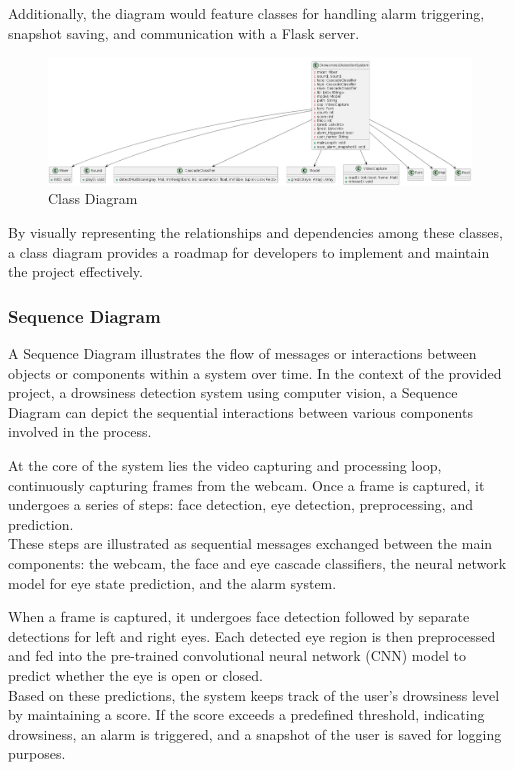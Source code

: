 \documentclass[12pt]{article}
\begin{document}
Additionally, the diagram would feature classes for handling alarm triggering, snapshot saving, and communication with a Flask server.
\begin{figure}[h]
\centering
\includegraphics[width=1.0\textwidth]{classdia}
\caption{ Class Diagram}
\end{figure}
\FloatBarrier
 By visually representing the relationships and dependencies among these classes, a class diagram provides a roadmap for developers to implement and maintain the project effectively.


\subsubsection{Sequence Diagram}
A Sequence Diagram illustrates the flow of messages or interactions between objects or components within a system over time. In the context of the provided project, a drowsiness detection system using computer vision, a Sequence Diagram can depict the sequential interactions between various components involved in the process. 

At the core of the system lies the video capturing and processing loop, continuously capturing frames from the webcam. Once a frame is captured, it undergoes a series of steps: face detection, eye detection, preprocessing, and prediction. \\These steps are illustrated as sequential messages exchanged between the main components: the webcam, the face and eye cascade classifiers, the neural network model for eye state prediction, and the alarm system.

When a frame is captured, it undergoes face detection followed by separate detections for left and right eyes. Each detected eye region is then preprocessed and fed into the pre-trained convolutional neural network (CNN) model to predict whether the eye is open or closed. \\Based on these predictions, the system keeps track of the user's drowsiness level by maintaining a score. If the score exceeds a predefined threshold, indicating drowsiness, an alarm is triggered, and a snapshot of the user is saved for logging purposes.
\end{document}
